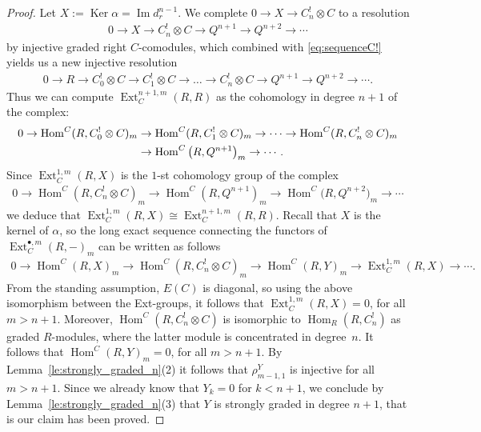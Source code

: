 \documentclass[11pt]{article}
\DeclareMathOperator{\Ker}{Ker}
\DeclareMathOperator{\im}{Im}
\newcommand\ot{\otimes}
\renewcommand{\^}[1]{\mbox{$^{\left( #1 \right)}$}}
\renewcommand{\_}[1]{\mbox{$_{\left( #1 \right)}$}}
\newcommand{\Ext}{\operatorname{Ext}}
\newcommand{\al}{\alpha}
\numberwithin{equation}{section}
\begin{document}
\begin{proof}
Let $X:=\Ker \al=\im d^{n-1}_r$. We complete $0 \rightarrow {X} \rightarrow C_n^! \otimes C$ to a resolution
\begin{gather*}
 0 \rightarrow X\rightarrow C_n^!\ot C \rightarrow Q^{n+1} \rightarrow Q^{n+2} \rightarrow \cdots
\end{gather*}
by injective graded right $C$-comodules, which combined with \eqref{eq:sequenceC!} yields us a new injective resolution
\begin{gather*} %
0 \rightarrow R \rightarrow C_0^!\ot C \rightarrow C_1^!\ot C\rightarrow \dots \rightarrow C_n^! \otimes C \rightarrow Q^{n+1} \rightarrow Q^{n+2} \rightarrow \cdots.
\end{gather*}
Thus we can compute $\operatorname{Ext}_C^{n+1,m}(R,R)$ as the cohomology in degree $n+1$ of the complex:
\begin{gather*}
 0 \rightarrow \operatorname{Hom}^C(R,C_0^!\ot C)_m \rightarrow \operatorname{Hom}^C(R,C_1^!\ot C)_m \rightarrow \dots \rightarrow \operatorname{Hom}^C(R, C_n^!\ot C)_m\\
 \hphantom{0}{} \rightarrow \operatorname{Hom}^C\big(R,Q^{n+1}\big)_m \rightarrow \cdots.
\end{gather*}
Since $\operatorname{Ext}^{1,m}_C(R,X)$ is the $1$-st cohomology group of the complex
\begin{gather*}
 0 \rightarrow \operatorname{Hom}^C(R,C_n^! \otimes C)_m \rightarrow \operatorname{Hom}^C(R,Q^{n+1})_m \rightarrow \operatorname{Hom}^C\big(R,Q^{n+2}\big)_m \rightarrow \cdots
\end{gather*}
we deduce that $\operatorname{Ext}^{1,m}_C(R,X)\cong\operatorname{Ext}_C^{n+1,m}(R,R)$. Recall that $X$ is the kernel of $\al$, so the long exact sequence connecting the functors of $\Ext^{\bullet,m}_C(R,-)_m$ can be written as follows
\begin{gather*}
 0 \rightarrow \operatorname{Hom}^C(R,X)_m \rightarrow \operatorname{Hom}^C(R, C_n^! \otimes C)_m \rightarrow \operatorname{Hom}^C(R,Y)_m \rightarrow \operatorname{Ext}^{1,m}_C(R,X) \rightarrow \cdots.
\end{gather*}
From the standing assumption, $E(C)$ is diagonal, so using the above isomorphism between the Ext-groups, it follows that $\operatorname{Ext}_C^{1,m}(R,X)=0$, for all $m>n+1$. Moreover, $\operatorname{Hom}^C(R,C_n^! \otimes C)$ is isomorphic to $\operatorname{Hom}_R(R,C_n^! )$ as graded $R$-modules, where the latter module is concentrated in degree~$n$. It follows that $\operatorname{Hom}^C(R,Y)_m=0$, for all $m > n+1$. By Lemma~\ref{le:strongly_graded_n}(2) it follows that $\rho^Y_{m-1,1}$ is injective for all $m>n+1$. Since we already know that $Y_k=0$ for $k<n+1$, we conclude by Lemma~\ref{le:strongly_graded_n}(3) that $Y$ is strongly graded in degree $n+1$, that is our claim has been proved.


\end{proof}
\end{document}

